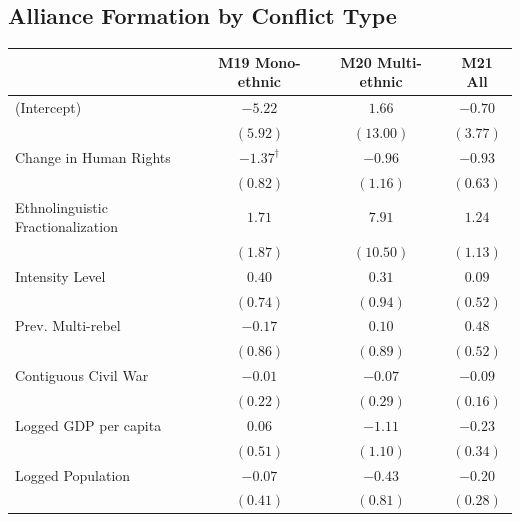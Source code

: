 \documentclass[12pt,]{book}
\let\origtable\table
\let\endorigtable\endtable
\renewenvironment{table}[1][2] {
    \singlespacing
    \expandafter\origtable\expandafter[H]
} {
    \endorigtable
}
\theoremstyle{definition}
\theoremstyle{definition}
\theoremstyle{definition}
\theoremstyle{remark}
\begin{document}
\hypertarget{alliance-formation-by-conflict-type}{%
\subsection*{Alliance Formation by Conflict
Type}\label{alliance-formation-by-conflict-type}}

\begin{table}
\begin{center}
\begin{tabular}{l c c c }
\hline
 & M19 Mono-ethnic & M20 Multi-ethnic & M21 All \\
\hline
(Intercept)                       & $-5.22$           & $1.66$    & $-0.70$  \\
                                  & $(5.92)$          & $(13.00)$ & $(3.77)$ \\
Change in Human Rights            & $-1.37^{\dagger}$ & $-0.96$   & $-0.93$  \\
                                  & $(0.82)$          & $(1.16)$  & $(0.63)$ \\
Ethnolinguistic Fractionalization & $1.71$            & $7.91$    & $1.24$   \\
                                  & $(1.87)$          & $(10.50)$ & $(1.13)$ \\
Intensity Level                   & $0.40$            & $0.31$    & $0.09$   \\
                                  & $(0.74)$          & $(0.94)$  & $(0.52)$ \\
Prev. Multi-rebel                 & $-0.17$           & $0.10$    & $0.48$   \\
                                  & $(0.86)$          & $(0.89)$  & $(0.52)$ \\
Contiguous Civil War              & $-0.01$           & $-0.07$   & $-0.09$  \\
                                  & $(0.22)$          & $(0.29)$  & $(0.16)$ \\
Logged GDP per capita             & $0.06$            & $-1.11$   & $-0.23$  \\
                                  & $(0.51)$          & $(1.10)$  & $(0.34)$ \\
Logged Population                 & $-0.07$           & $-0.43$   & $-0.20$  \\
                                  & $(0.41)$          & $(0.81)$  & $(0.28)$ \\

\end{tabular}
\end{center}
\end{table}
\end{document}
